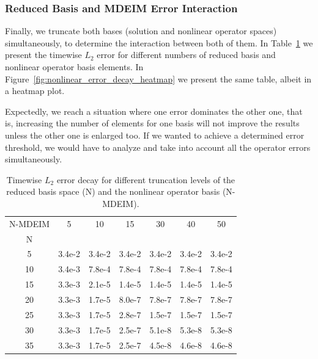 \documentclass[../../thesis.tex]{subfiles}
\begin{document}
\subsubsection{Reduced Basis and MDEIM Error Interaction}
Finally, we truncate both bases (solution and nonlinear operator spaces)
simultaneously, to determine the interaction between both of them.
In Table~\ref{tab:nonlinear_error_decay_heatmap} we present 
the timewise $L_2$ error for different numbers of reduced basis 
and nonlinear operator basis elements.
In Figure~\ref{fig:nonlinear_error_decay_heatmap} we present the same table,
albeit in a heatmap plot. 

Expectedly, we reach a situation where one error dominates the other one,
that is, increasing the number of elements for one basis will not improve the
results unless the other one is enlarged too.
If we wanted to achieve a determined error threshold,
we would have to analyze and take into account all the operator errors simultaneously.
\begin{table}[h]
    \centering
    \caption{Timewise $L_2$ error decay for different truncation levels 
    of the reduced basis space (N) 
    and the nonlinear operator basis (N-MDEIM).}
    \begin{tabular}{ccccccc}
        \toprule
        N-MDEIM &      5  &      10 &      15 &      30 &      40 &      50 \\
        N  &         &         &         &         &         &         \\
        \midrule
        5  & 3.4e-2 & 3.4e-2 & 3.4e-2 & 3.4e-2 & 3.4e-2 & 3.4e-2 \\
        10 & 3.4e-3 & 7.8e-4 & 7.8e-4 & 7.8e-4 & 7.8e-4 & 7.8e-4 \\
        15 & 3.3e-3 & 2.1e-5 & 1.4e-5 & 1.4e-5 & 1.4e-5 & 1.4e-5 \\
        20 & 3.3e-3 & 1.7e-5 & 8.0e-7 & 7.8e-7 & 7.8e-7 & 7.8e-7 \\
        25 & 3.3e-3 & 1.7e-5 & 2.8e-7 & 1.5e-7 & 1.5e-7 & 1.5e-7 \\
        30 & 3.3e-3 & 1.7e-5 & 2.5e-7 & 5.1e-8 & 5.3e-8 & 5.3e-8 \\
        35 & 3.3e-3 & 1.7e-5 & 2.5e-7 & 4.5e-8 & 4.6e-8 & 4.6e-8 \\
        \bottomrule
    \end{tabular}
    \label{tab:nonlinear_error_decay_heatmap}
\end{table}
\end{document}
